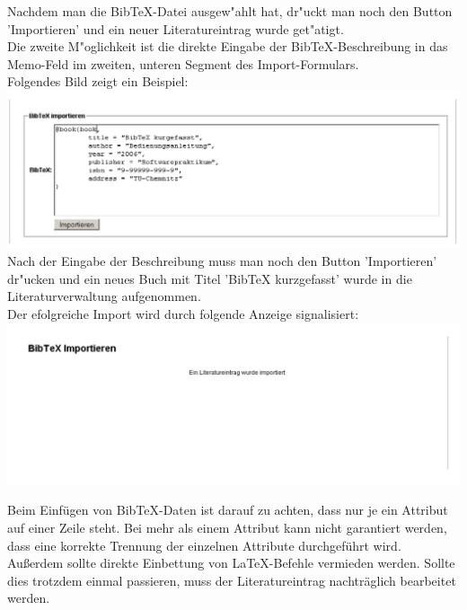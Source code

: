 Nachdem man die BibTeX-Datei ausgew"ahlt hat, dr"uckt man noch den Button 'Importieren' und ein neuer Literatureintrag wurde get"atigt.\\[0.4cm]
Die zweite M"oglichkeit ist die direkte Eingabe der BibTeX-Beschreibung in das Memo-Feld im zweiten, unteren Segment des Import-Formulars.\\
Folgendes Bild zeigt ein Beispiel:\\
\includegraphics[scale=0.8]{import2}\\
Nach der Eingabe der Beschreibung muss man noch den Button 'Importieren' dr"ucken und ein neues Buch mit Titel 'BibTeX kurzgefasst' wurde in die Literaturverwaltung aufgenommen.\\
Der efolgreiche Import wird durch folgende Anzeige signalisiert:\\
\includegraphics[scale=0.8]{import_succ}

Beim Einfügen von BibTeX-Daten ist darauf zu achten, dass nur je ein Attribut auf einer Zeile steht. Bei mehr als einem Attribut kann nicht garantiert werden, dass eine korrekte Trennung der einzelnen Attribute durchgeführt wird. Außerdem sollte direkte Einbettung von LaTeX-Befehle vermieden werden. Sollte dies trotzdem einmal passieren, muss der Literatureintrag nachträglich bearbeitet werden.

